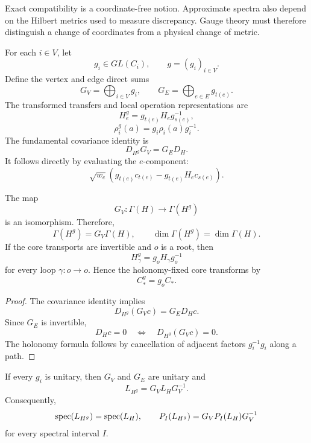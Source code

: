 
Exact compatibility is a coordinate-free notion. Approximate spectra also
depend on the Hilbert metrics used to measure discrepancy. Gauge theory must
therefore distinguish a change of coordinates from a physical change of
metric.


For each \(i\in V\), let
\[
g_i\in GL(C_i),
\qquad
g=(g_i)_{i\in V}.
\]
Define the vertex and edge direct sums
\[
G_V=\bigoplus_{i\in V}g_i,
\qquad
G_E=\bigoplus_{e\in E}g_{t(e)}.
\]
The transformed transfers and local operation representations are
\[
H_e^g
=
 g_{t(e)}H_eg_{s(e)}^{-1},
\]
\[
\rho_i^g(a)
=
 g_i\rho_i(a)g_i^{-1}.
\]
The fundamental covariance identity is
\[
\boxed{
D_{H^g}G_V=G_ED_H.
}
\]
It follows directly by evaluating the \(e\)-component:
\[
\sqrt{w_e}
\left(
 g_{t(e)}c_{t(e)}
-
 g_{t(e)}H_ec_{s(e)}
\right).
\]


\begin{theorem}\label{thm:gauge-covariance}
The map
\[
G_V:\Gamma(H)\longrightarrow\Gamma(H^g)
\]
is an isomorphism. Therefore,
\[
\boxed{
\Gamma(H^g)=G_V\Gamma(H),
\qquad
\dim\Gamma(H^g)=\dim\Gamma(H).
}
\]
If the core transports are invertible and \(o\) is a root, then
\[
H_\gamma^g=g_oH_\gamma g_o^{-1}
\]
for every loop \(\gamma:o\to o\). Hence the holonomy-fixed core transforms by
\[
C_*^g=g_oC_*.
\]
\end{theorem}

\begin{proof}
The covariance identity implies
\[
D_{H^g}(G_Vc)=G_ED_Hc.
\]
Since \(G_E\) is invertible,
\[
D_Hc=0
\quad\Longleftrightarrow\quad
D_{H^g}(G_Vc)=0.
\]
The holonomy formula follows by cancellation of adjacent factors
\(g_i^{-1}g_i\) along a path.
\end{proof}

\begin{theorem}\label{thm:unitary-gauge}
If every \(g_i\) is unitary, then \(G_V\) and \(G_E\) are unitary and
\[
\boxed{
L_{H^g}=G_VL_HG_V^{-1}.
}
\]
Consequently,
\[
\operatorname{spec}(L_{H^g})=\operatorname{spec}(L_H),
\qquad
P_I(L_{H^g})=G_VP_I(L_H)G_V^{-1}
\]
for every spectral interval \(I\).
\end{theorem}

